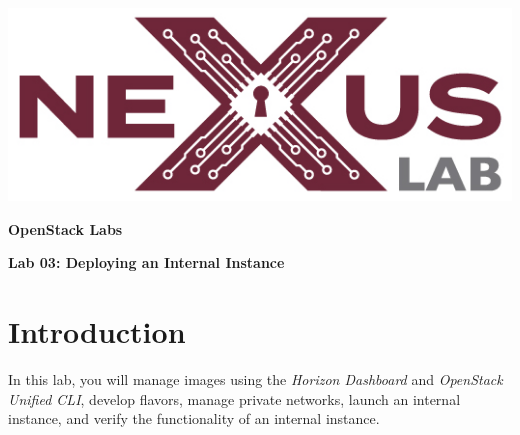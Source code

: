 \documentclass[letterpaper, 12pt]{article}
\begin{document}
\begin{titlepage}
    \centering
    \includegraphics[scale=0.5]{images/nexus_lab_logo.png}

    \vspace*{\baselineskip}

    \textbf{\Large OpenStack Labs}

    \vspace*{\baselineskip}

    \textbf{\Large Lab 03: Deploying an Internal Instance}
    \vspace*{\fill}
\end{titlepage}

{
    \fancyhf{}
    \fancyfoot[R]{\footnotesize\thepage}
    \renewcommand{\headrulewidth}{0pt}
}

\pagestyle{fancy}
\tableofcontents
\clearpage

\section*{Introduction}
\label{sec:introduction}
In this lab, you will manage images using the \textit{Horizon Dashboard} and \textit{OpenStack Unified CLI}, develop
flavors, manage private networks, launch an internal instance, and verify the functionality of an internal instance.
\end{document}
